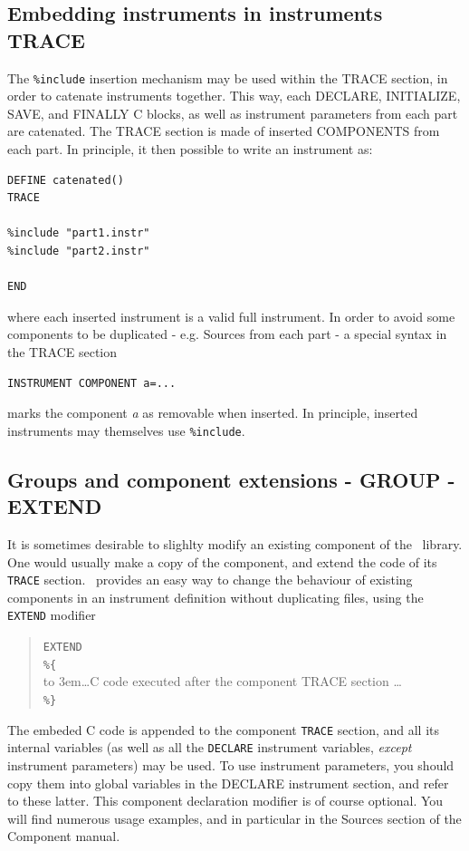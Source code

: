 \subsection{Embedding instruments in instruments TRACE}
\label{s:instrdefs-include-instr}
The \texttt{\%include} insertion mechanism may be used within the TRACE section, in order to catenate instruments together. This way, each DECLARE, INITIALIZE, SAVE, and FINALLY C blocks, as well as instrument parameters from each part are catenated. The TRACE section is made of inserted COMPONENTS from each part. In principle, it then possible to write an instrument as:
\begin{verbatim}
DEFINE catenated()
TRACE

%include "part1.instr"
%include "part2.instr"

END
\end{verbatim}
where each inserted instrument is a valid full instrument. In order to avoid some components to be duplicated - e.g. Sources from each part - a special syntax in the TRACE section
\begin{verbatim}
INSTRUMENT COMPONENT a=...
\end{verbatim}
marks the component \textit{a} as removable when inserted. In principle, inserted instruments may themselves use \texttt{\%include}.

\subsection{Groups and component extensions - GROUP - EXTEND}
\label{s:instrdefs-extend-group}

It is sometimes desirable to slighlty modify an existing component of the \MCX\ library. One would usually make a copy of the component, and extend the code of its \texttt{TRACE} section. \MCX\ provides an easy way to change the behaviour of existing components in an instrument definition without duplicating files, using the \texttt{EXTEND} modifier 
\begin{quote}
  \texttt{EXTEND} \\
  \verb|%{| \\
  \hbox to 3em{}\ldots C code executed after the component TRACE section \ldots \\
  \verb|%}|
\end{quote} 
The embeded C code is appended to the component \texttt{TRACE} section, and all its internal variables (as well as all the \texttt{DECLARE} instrument variables, \emph{except} instrument parameters) may be used. To use instrument parameters, you should copy them into global variables in the DECLARE instrument section, and refer to these latter.
This component declaration modifier is of course optional. You will find numerous usage examples, and in particular in the Sources section of the Component manual.

